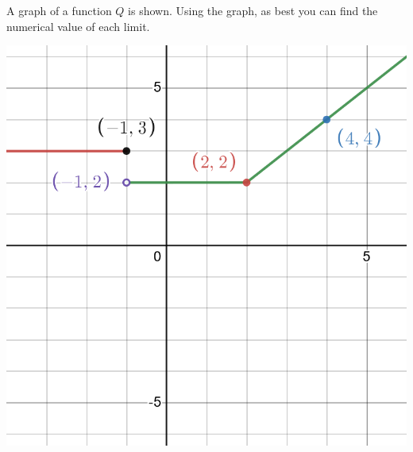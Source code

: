 \documentclass[12pt,fleqn]{exam}
\begin{document}
\begin{questions}
\begin{parts}
\begin{solution}[1.5in]
    \end{solution}


\end{parts}


\question A graph of a function $Q$ is shown. Using the graph,
as best you can find the numerical value of each limit.


\begin{center}
\includegraphics[scale=0.25]{desmos-graph(28).png}
\end{center}

\end{questions}
\end{document}
